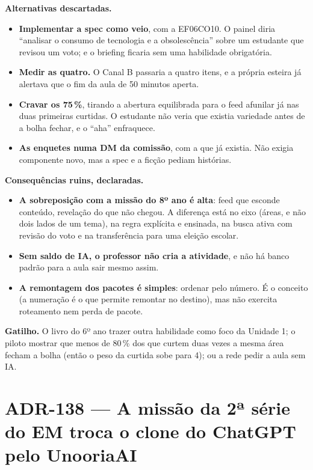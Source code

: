 \textbf{Alternativas descartadas.}

\begin{itemize}
  \item \textbf{Implementar a spec como veio}, com a EF06CO10. O painel diria
    ``analisar o consumo de tecnologia e a obsolescência'' sobre um estudante
    que revisou um voto; e o briefing ficaria sem uma habilidade obrigatória.
  \item \textbf{Medir as quatro.} O Canal B passaria a quatro itens, e a
    própria esteira já alertava que o fim da aula de 50 minutos aperta.
  \item \textbf{Cravar os 75\,\%}, tirando a abertura equilibrada para o feed
    afunilar já nas duas primeiras curtidas. O estudante não veria que existia
    variedade antes de a bolha fechar, e o ``aha'' enfraquece.
  \item \textbf{As enquetes numa DM da comissão}, com a  que já
    existia. Não exigia componente novo, mas a spec e a ficção pediam histórias.
\end{itemize}

\textbf{Consequências ruins, declaradas.}

\begin{itemize}
  \item \textbf{A sobreposição com a missão do 8º ano é alta}: feed que esconde
    conteúdo, revelação do que não chegou. A diferença está no eixo (áreas, e
    não dois lados de um tema), na regra explícita e ensinada, na busca ativa
    com revisão do voto e na transferência para uma eleição escolar.
  \item \textbf{Sem saldo de IA, o professor não cria a atividade}, e não há
    banco padrão para a aula sair mesmo assim.
  \item \textbf{A remontagem dos pacotes é simples}: ordenar pelo número. É o
    conceito (a numeração é o que permite remontar no destino), mas não exercita
    roteamento nem perda de pacote.
\end{itemize}

\textbf{Gatilho.} O livro do 6º ano trazer outra habilidade como foco da
Unidade 1; o piloto mostrar que menos de 80\,\% dos que curtem duas vezes a
mesma área fecham a bolha (então o peso da curtida sobe para 4); ou a rede
pedir a aula sem IA.

\section{ADR-138 --- A missão da 2ª série do EM troca o clone do ChatGPT pelo UnooriaAI}
\label{adr:exp02em1b-unooriaai}

